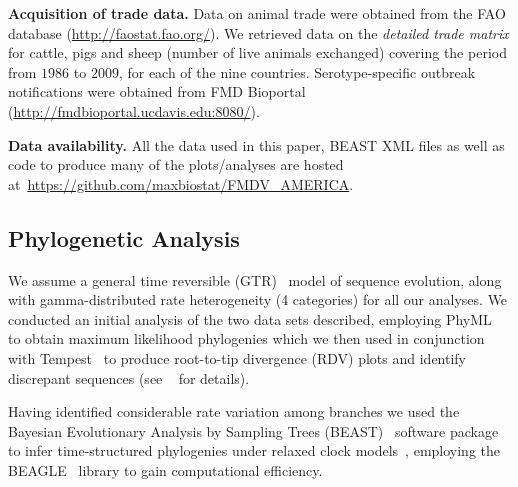 \documentclass[10pt]{article}
\begin{document}
\textbf{Acquisition of trade data.}
Data on animal trade were obtained from the FAO database (\url{http://faostat.fao.org/}).
We retrieved data on the \textit{detailed trade matrix} for cattle, pigs and sheep (number of live animals exchanged) covering the period from $1986$ to $2009$, for each of the nine countries.
Serotype-specific outbreak notifications were obtained from FMD Bioportal (\url{http://fmdbioportal.ucdavis.edu:8080/}).

\textbf{Data availability.} All the data used in this paper, BEAST XML files as well as code to produce many of the plots/analyses are hosted at~\url{https://github.com/maxbiostat/FMDV_AMERICA}.

\subsection*{Phylogenetic Analysis}

We assume a general time reversible (GTR)~\citep{Tavare1986} model of sequence evolution, along with gamma-distributed rate heterogeneity (4 categories) for all our analyses.
We conducted an initial analysis of the two data sets described, employing PhyML~\citep{Guindon2003} to obtain maximum likelihood phylogenies which we then used in conjunction with Tempest~\citep{Rambaut2016} to produce root-to-tip divergence (RDV) plots and identify discrepant sequences (see ~\cite{Rambaut2016} for details).


Having identified considerable rate variation among branches we used the Bayesian Evolutionary Analysis by Sampling Trees (BEAST)~\citep{Drummond2012,Suchard2018} software package to infer time-structured phylogenies under relaxed clock models~\citep{Drummond2006}, employing the BEAGLE~\citep{Ayres2012} library to gain computational efficiency.
\end{document}
